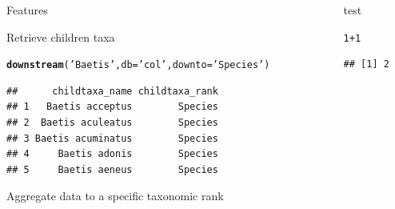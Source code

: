\documentclass[final,t]{beamer}\usepackage[]{graphicx}\usepackage[]{color}
\makeatletter
\newcommand{\hlnum}[1]{\textcolor[rgb]{0.686,0.059,0.569}{#1}}%
\newcommand{\hlstr}[1]{\textcolor[rgb]{0.192,0.494,0.8}{#1}}%
\newcommand{\hlopt}[1]{\textcolor[rgb]{0,0,0}{#1}}%
\newcommand{\hlstd}[1]{\textcolor[rgb]{0.345,0.345,0.345}{#1}}%
\newcommand{\hlkwc}[1]{\textcolor[rgb]{0.333,0.667,0.333}{#1}}%
\newcommand{\hlkwd}[1]{\textcolor[rgb]{0.737,0.353,0.396}{\textbf{#1}}}%
\newenvironment{kframe}{%
 \def\at@end@of@kframe{}%
 \ifinner\ifhmode%
  \def\at@end@of@kframe{\end{minipage}}%
  \begin{minipage}{\columnwidth}%
 \fi\fi%
 \def\FrameCommand##1{\hskip\@totalleftmargin \hskip-\fboxsep
 \colorbox{shadecolor}{##1}\hskip-\fboxsep
     \hskip-\linewidth \hskip-\@totalleftmargin \hskip\columnwidth}%
 \MakeFramed {\advance\hsize-\width
   \@totalleftmargin\z@ \linewidth\hsize
   \@setminipage}}%
 {\par\unskip\endMakeFramed%
 \at@end@of@kframe}
\newenvironment{knitrout}{}{} %
\renewenvironment{knitrout}{\begin{footnotesize}}{\end{footnotesize}}
\makeatother
\begin{document}
\begin{frame}[fragile]
\begin{columns}[t]
\begin{column}{.49\linewidth}
\begin{block}{Features}
					
Retrieve children taxa
\begin{knitrout}\footnotesize
{}\color{fgcolor}\begin{kframe}
\begin{alltt}
\hlkwd{downstream}\hlstd{(}\hlstr{'Baetis'}\hlstd{,} \hlkwc{db} \hlstd{=} \hlstr{'col'}\hlstd{,} \hlkwc{downto} \hlstd{=} \hlstr{'Species'}\hlstd{)}
\end{alltt}
\end{kframe}
\end{knitrout}
\begin{knitrout}\footnotesize
{}\color{fgcolor}\begin{kframe}
\begin{verbatim}
##      childtaxa_name childtaxa_rank
## 1   Baetis acceptus        Species
## 2  Baetis aculeatus        Species
## 3 Baetis acuminatus        Species
## 4     Baetis adonis        Species
## 5     Baetis aeneus        Species
\end{verbatim}
\end{kframe}
\end{knitrout}
					
Aggregate data to a specific taxonomic rank


			\end{block}
		\end{column}
    
		\begin{column}{0.005\linewidth}
		\end{column}


		\begin{column}{.49\linewidth}
			\vspace{-\baselineskip}
      
      \begin{block}{test}
\begin{knitrout}\footnotesize
{}\color{fgcolor}\begin{kframe}
\begin{alltt}
\hlnum{1}\hlopt{+}\hlnum{1}
\end{alltt}
\begin{verbatim}
## [1] 2
\end{verbatim}
\end{kframe}
\end{knitrout}

      \end{block}
      

\end{column}
\end{columns}
\end{frame}
\end{document}
